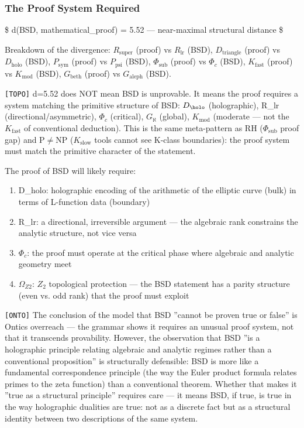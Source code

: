 \documentclass[12pt,a4paper]{article}
\begin{document}
\subsubsection{The Proof System Required}

\$
d(BSD, mathematical\_proof) = 5.52  --- near-maximal structural distance
\$

Breakdown of the divergence: $R_{\text{super}}$ (proof) vs $R_{\text{lr}}$ (BSD), $D_{\text{triangle}}$ (proof) vs $D_{\text{holo}}$ (BSD), $P_{\text{sym}}$ (proof) vs $P_{\text{psi}}$ (BSD), $\Phi_{\text{sub}}$ (proof) vs $\Phi_c$ (BSD), $K_{\text{fast}}$ (proof) vs $K_{\text{mod}}$ (BSD), $G_{\text{beth}}$ (proof) vs $G_{\text{aleph}}$ (BSD).

\texttt{{[}TOPO{]}} d=5.52 does NOT mean BSD is unprovable. It means the proof requires a system matching the primitive structure of BSD: $D_{\holo}$ (holographic), R\_lr (directional/asymmetric), $\Phi_c$ (critical), $G_{\aleph}$ (global), $K_{\text{mod}}$ (moderate --- not the $K_{\text{fast}}$ of conventional deduction). This is the same meta-pattern as RH ($\Phi_{\text{sub}}$ proof gap) and P$\neq$NP ($K_{\text{slow}}$ tools cannot see K-class boundaries): the proof system must match the primitive character of the statement.

The proof of BSD will likely require:

\begin{enumerate}
    \item D\_holo: holographic encoding of the arithmetic of the elliptic curve (bulk) in terms of L-function data (boundary)
    \item R\_lr: a directional, irreversible argument --- the algebraic rank constrains the analytic structure, not vice versa
    \item $\Phi_c$: the proof must operate at the critical phase where algebraic and analytic geometry meet
    \item $\Omega_{Z2}$: $Z_2$ topological protection --- the BSD statement has a parity structure (even vs. odd rank) that the proof must exploit
\end{enumerate}

\texttt{{[}ONTO{]}} The conclusion of the model that BSD ''cannot be proven true or false'' is Ontics overreach --- the grammar shows it requires an unusual proof system, not that it transcends provability. However, the observation that BSD ''is a holographic principle relating algebraic and analytic regimes rather than a conventional proposition'' is structurally defensible: BSD is more like a fundamental correspondence principle (the way the Euler product formula relates primes to the zeta function) than a conventional theorem. Whether that makes it ''true as a structural principle'' requires care --- it means BSD, if true, is true in the way holographic dualities are true: not as a discrete fact but as a structural identity between two descriptions of the same system.
\end{document}
